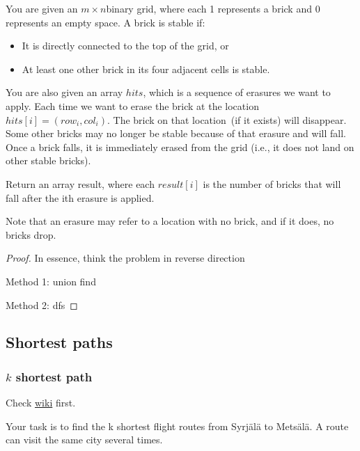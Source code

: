 \documentclass[11pt]{article}
\begin{document}
\begin{problem}
You are given an \(m\times n\)binary grid, where each 1 represents a brick and 0 represents an empty
space. A brick is stable if:
\begin{itemize}
\item It is directly connected to the top of the grid, or
\item At least one other brick in its four adjacent cells is stable.
\end{itemize}

You are also given an array \(hits\), which is a sequence of erasures we want to apply. Each time we
want to erase the brick at the location \(hits[i] = (row_i, col_i)\). The brick on that location (if
it exists) will disappear. Some other bricks may no longer be stable because of that erasure and
will fall. Once a brick falls, it is immediately erased from the grid (i.e., it does not land on
other stable bricks).

Return an array result, where each \(result[i]\) is the number of bricks that will fall after the ith erasure is applied.

Note that an erasure may refer to a location with no brick, and if it does, no bricks drop.
\end{problem}

\begin{proof}
In essence, think the problem in reverse direction

Method 1: union find

Method 2: dfs
\end{proof}

\subsection{Shortest paths}
\label{sec:orgdf454d2}
\subsubsection{\texorpdfstring{\(k\)}{k} shortest path}
\label{sec:orgd703a42}
Check \href{https://en.wikipedia.org/wiki/K\_shortest\_path\_routing}{wiki} first.

\begin{problem}
Your task is to find the k shortest flight routes from Syrjälä to Metsälä. A route can visit the
same city several times.
\end{problem}
\end{document}
